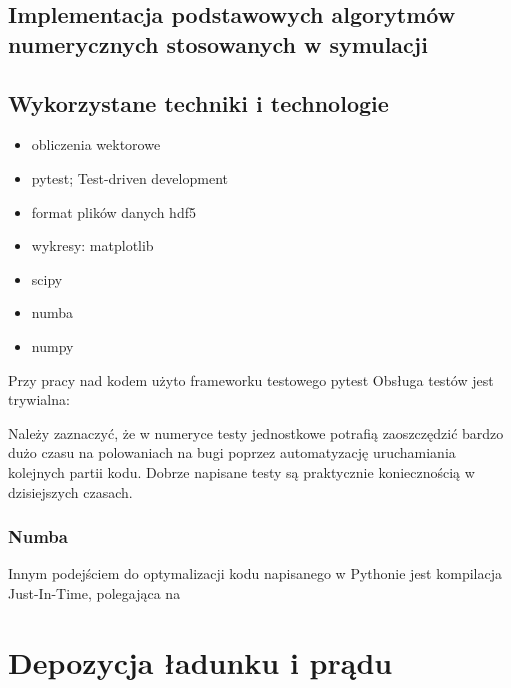 \subsection{Implementacja podstawowych algorytmów numerycznych stosowanych w symulacji}
\subsection{Wykorzystane techniki i technologie}
\begin{itemize}
    \item obliczenia wektorowe
    \item pytest; Test-driven development
    \item format plików danych hdf5
    \item wykresy: matplotlib
    \item scipy
    \item numba
    \item numpy
\end{itemize}

Przy pracy nad kodem użyto frameworku testowego pytest %
Obsługa testów jest trywialna:

Należy zaznaczyć, że w numeryce testy jednostkowe potrafią zaoszczędzić bardzo dużo czasu na polowaniach na bugi
poprzez automatyzację uruchamiania kolejnych partii kodu. Dobrze napisane testy są praktycznie koniecznością w dzisiejszych
czasach. %

\subsubsection{Numba}

Innym podejściem do optymalizacji kodu napisanego w Pythonie jest kompilacja Just-In-Time, polegająca na %



\section{Depozycja ładunku i prądu}

